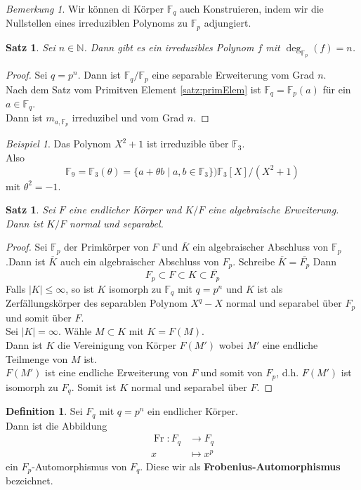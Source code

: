 \documentclass[10pt,a4paper]{article}
\newcommand{\N}{\ensuremath{\mathbb{N}}}
\newcommand{\F}{\ensuremath{\mathbb{F}}}
\newcommand{\ol}[1]{\overline{#1}}
\newcommand{\abs}[1]{\left|#1\right|}
\newcommand{\Fr}{\operatorname{Fr}}
\theoremstyle{plain}
\newtheorem{satz}[theorem]{Satz}
\theoremstyle{definition}
\newtheorem{definition}[theorem]{Definition}
\theoremstyle{remark}
\newtheorem{bem}[theorem]{Bemerkung}
\newtheorem{exm}[theorem]{Beispiel}
\begin{document}
	\begin{bem}
		Wir können di Körper $\F_q$ auch Konstruieren, indem wir die Nullstellen eines irreduziblen Polynoms zu $\F_p$ adjungiert.
	\end{bem}

	\begin{satz}
		Sei $n\in\N$. Dann gibt es ein irreduzibles Polynom $f$ mit $\deg_{\F_p}(f)=n$.
	\end{satz}
	\begin{proof}
		Sei $q=p^n$. Dann ist $\F_q/\F_p$ eine separable Erweiterung vom Grad $n$.\\
		Nach dem Satz vom Primitven Element \ref{satz:primElem} ist $\F_q=\F_p(a)$ für ein $a\in\F_q$.\\
		Dann ist $m_{a,\F_p}$ irreduzibel und vom Grad $n$.
	\end{proof}

	\begin{exm}
		Das Polynom $X^2+1$ ist irreduzible über $\F_3$.\\
		Also
		\[\F_9=\F_3(\theta)=\{a+\theta b\mid a,b\in\F_3\})\F_3[X]/(X^2+1)\]
		mit $\theta^2=-1$.
	\end{exm}

	\begin{satz}
		Sei $F$ eine endlicher Körper und $K/F$ eine algebraische Erweiterung. Dann ist $K/F$ normal und separabel.
	\end{satz}
	\begin{proof}
		Sei $\F_p$ der Primkörper von $F$ und $\ol K$ ein algebraischer Abschluss von $\F_p$.Dann ist $\ol K$ auch ein algebraischer Abschluss von $F_p$. Schreibe $\ol K=\ol{F_p}$ Dann
		\[F_p\subset F\subset K\subset \ol{F_p}\]
		Falls $\abs K\leq \infty$, so ist $K$ isomorph zu $\F_q$ mit $q=p^n$ und $K$ ist als Zerfällungskörper des separablen Polynom  $X^{q}-X$ normal und separabel über $F_p$ und somit über $F$.\\
		Sei $\abs K=\infty$. Wähle $M\subset K$ mit $K=F(M)$.\\
		Dann ist $K$ die Vereinigung von Körper $F(M')$ wobei $M'$ eine endliche Teilmenge von $M$ ist.\\
		$F(M')$ ist eine endliche Erweiterung von $F$ und somit von $F_p$, d.h. $F(M')$ ist isomorph zu $F_q$. Somit ist $K$ normal und separabel über $F$.
	\end{proof}

	\begin{definition}
		Sei $F_q$ mit $q=p^n$ ein endlicher Körper.\\
		Dann ist die Abbildung
		\begin{align*}
		\Fr:F_q&\to F_q\\
		x&\mapsto x^p
		\end{align*}
		ein $F_p$-Automorphismus von $F_q$. Diese wir als \textbf{Frobenius-Automorphismus} bezeichnet.
	\end{definition}
\end{document}
